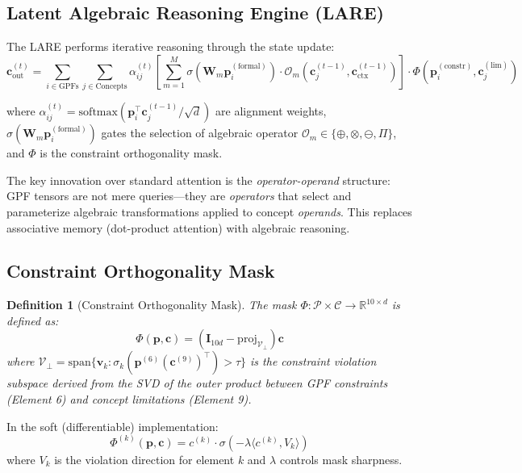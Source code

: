 \documentclass{article}
\newtheorem{definition}{Definition}
\newcommand{\R}{\mathbb{R}}
\newcommand{\cC}{\mathcal{C}}
\newcommand{\cP}{\mathcal{P}}
\newcommand{\cO}{\mathcal{O}}
\newcommand{\cV}{\mathcal{V}}
\newcommand{\bW}{\mathbf{W}}
\newcommand{\bc}{\mathbf{c}}
\newcommand{\bp}{\mathbf{p}}
\newcommand{\bI}{\mathbf{I}}
\begin{document}
\subsection{Latent Algebraic Reasoning Engine (LARE)}

The LARE performs iterative reasoning through the state update:
\begin{equation}\label{eq:lare}
\bc_{\text{out}}^{(t)} = \sum_{i \in \text{GPFs}} \sum_{j \in \text{Concepts}} \alpha_{ij}^{(t)} \left[\sum_{m=1}^{M} \sigma(\bW_m \bp_i^{(\text{formal})}) \cdot \cO_m(\bc_j^{(t-1)}, \bc_{\text{ctx}}^{(t-1)})\right] \cdot \Phi(\bp_i^{(\text{constr})}, \bc_j^{(\text{lim})})
\end{equation}

where $\alpha_{ij}^{(t)} = \mathrm{softmax}(\bp_i^\top \bc_j^{(t-1)} / \sqrt{d})$ are alignment weights, $\sigma(\bW_m \bp_i^{(\text{formal})})$ gates the selection of algebraic operator $\cO_m \in \{\oplus, \otimes, \ominus, \Pi\}$, and $\Phi$ is the constraint orthogonality mask.

The key innovation over standard attention is the \emph{operator-operand} structure: GPF tensors are not mere queries---they are \emph{operators} that select and parameterize algebraic transformations applied to concept \emph{operands}. This replaces associative memory (dot-product attention) with algebraic reasoning.

\subsection{Constraint Orthogonality Mask}

\begin{definition}[Constraint Orthogonality Mask]
The mask $\Phi: \cP \times \cC \to \R^{10 \times d}$ is defined as:
\begin{equation}
\Phi(\bp, \bc) = \left(\bI_{10d} - \mathrm{proj}_{\cV_\perp}\right) \bc
\end{equation}
where $\cV_\perp = \mathrm{span}\{\mathbf{v}_k : \sigma_k(\bp^{(6)} (\bc^{(9)})^\top) > \tau\}$ is the constraint violation subspace derived from the SVD of the outer product between GPF constraints (Element 6) and concept limitations (Element 9).
\end{definition}

In the soft (differentiable) implementation:
\begin{equation}
\Phi^{(k)}(\bp, \bc) = c^{(k)} \cdot \sigma(-\lambda \langle c^{(k)}, V_k \rangle)
\end{equation}
where $V_k$ is the violation direction for element $k$ and $\lambda$ controls mask sharpness.
\end{document}
